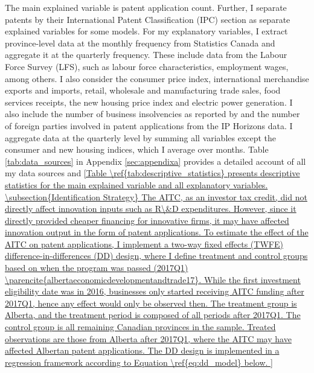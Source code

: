 \documentclass[../main.tex]{subfiles}
\begin{document}
The main explained variable is patent application count. Further, I separate patents by their International Patent Classification (IPC) section as separate explained variables for some models. For my explanatory variables, I extract province-level data at the monthly frequency from Statistics Canada and aggregate it at the quarterly frequency. These include data from the Labour Force Survey (LFS), such as labour force characteristics, employment wages, among others. I also consider the consumer price index, international merchandise exports and imports, retail, wholesale and manufacturing trade sales, food services receipts, the new housing price index and electric power generation. I also include the number of business insolvencies as reported by \textcite{insolvency24} and the number of foreign parties involved in patent applications from the IP Horizons data. I aggregate data at the quarterly level by summing all variables except the consumer and new housing indices, which I average over months. Table \ref{tab:data_sources} in Appendix \ref{sec:appendixa} provides a detailed account of all my data sources and \ref{Table \ref{tab:descriptive_statistics} presents descriptive statistics for the main explained variable and all explanatory variables.

\subsection{Identification Strategy}
The AITC, as an investor tax credit, did not directly affect innovation inputs such as R\&D expenditures. However, since it directly provided cheaper financing for innovative firms, it may have affected innovation output in the form of patent applications. To estimate the effect of the AITC on patent applications, I implement a two-way fixed effects (TWFE) difference-in-differences (DD) design, where I define treatment and control groups based on when the program was passed (2017Q1) \parencite{albertaeconomicdevelopmentandtrade17}. While the first investment eligibility date was in 2016, businesses only started receiving AITC funding after 2017Q1, hence any effect would only be observed then. The treatment group is Alberta, and the treatment period is composed of all periods after 2017Q1. The control group is all remaining Canadian provinces in the sample. Treated observations are those from Alberta after 2017Q1, where the AITC may have affected Albertan patent applications. The DD design is implemented in a regression framework according to Equation \ref{eq:dd_model} below.

}
\end{document}
